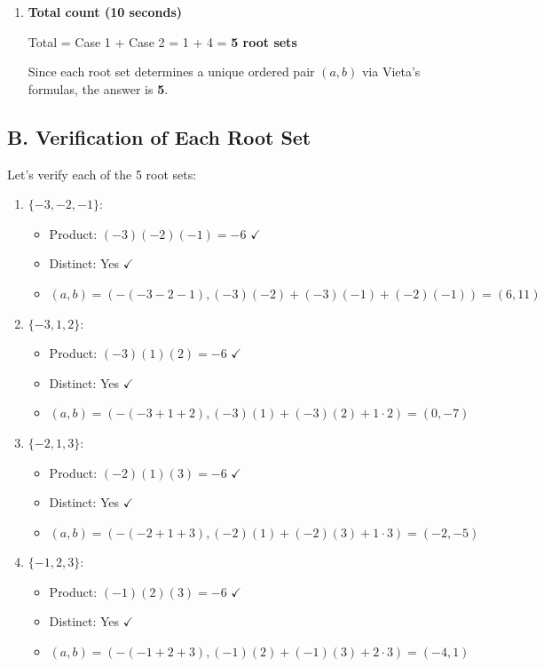 \documentclass[12pt]{article}
\begin{document}
\begin{solutionbox}
\begin{enumerate}[leftmargin=*]
    \item \textbf{Total count (10 seconds)}
    
    Total = Case 1 + Case 2 = 1 + 4 = \textbf{5 root sets}
    
    Since each root set determines a unique ordered pair $(a,b)$ via Vieta's formulas, the answer is \textbf{5}.
\end{enumerate}

\subsection*{B. Verification of Each Root Set}

Let's verify each of the 5 root sets:

\begin{enumerate}
    \item \textbf{$\{-3, -2, -1\}$}:
    \begin{itemize}
        \item Product: $(-3)(-2)(-1) = -6$ $\checkmark$
        \item Distinct: Yes $\checkmark$
        \item $(a,b) = (-(-3-2-1), (-3)(-2)+(-3)(-1)+(-2)(-1)) = (6, 11)$
    \end{itemize}
    
    \item \textbf{$\{-3, 1, 2\}$}:
    \begin{itemize}
        \item Product: $(-3)(1)(2) = -6$ $\checkmark$
        \item Distinct: Yes $\checkmark$
        \item $(a,b) = (-(-3+1+2), (-3)(1)+(-3)(2)+1 \cdot 2) = (0, -7)$
    \end{itemize}
    
    \item \textbf{$\{-2, 1, 3\}$}:
    \begin{itemize}
        \item Product: $(-2)(1)(3) = -6$ $\checkmark$
        \item Distinct: Yes $\checkmark$
        \item $(a,b) = (-(-2+1+3), (-2)(1)+(-2)(3)+1 \cdot 3) = (-2, -5)$
    \end{itemize}
    
    \item \textbf{$\{-1, 2, 3\}$}:
    \begin{itemize}
        \item Product: $(-1)(2)(3) = -6$ $\checkmark$
        \item Distinct: Yes $\checkmark$
        \item $(a,b) = (-(-1+2+3), (-1)(2)+(-1)(3)+2 \cdot 3) = (-4, 1)$
    \end{itemize}
    

\end{enumerate}
\end{solutionbox}
\end{document}
